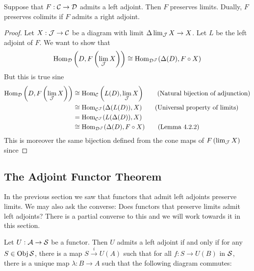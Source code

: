\documentclass[a4paper]{article}
\begin{document}
\begin{prp}{}{} Suppose that $F:\mathcal{C}\to\mathcal{D}$ admits a left adjoint. Then $F$ preserves limits. Dually, $F$ preserves colimits if $F$ admits a right adjoint. \tcbline
\begin{proof}
Let $X:\mathcal{J}\to\mathcal{C}$ be a diagram with limit $\Delta\lim_{\mathcal{J}} X\to X$. Let $L$ be the left adjoint of $F$. We want to show that $$\operatorname{Hom}_{\mathcal{D}}\left(D,F\left(\lim_{\mathcal{J}} X\right)\right)\cong\operatorname{Hom}_{\mathcal{D}^{\mathcal{J}}}(\Delta(D),F\circ X)$$
But this is true sine
\begin{align*}
\operatorname{Hom}_{\mathcal{D}}\left(D,F\left(\lim_{\mathcal{J}} X\right)\right)&\cong\operatorname{Hom}_{\mathcal{C}}\left(L(D),\lim_{\mathcal{J}} X\right)\tag{Natural bijection of adjunction}\\
&\cong\operatorname{Hom}_{\mathcal{C}^{\mathcal{J}}}(\Delta(L(D)),X)\tag{Universal property of limits}\\
&=\operatorname{Hom}_{\mathcal{C}^{\mathcal{J}}}(L(\Delta(D)),X)\\
&\cong\operatorname{Hom}_{\mathcal{D}^{\mathcal{J}}}(\Delta(D),F\circ X)\tag{Lemma 4.2.2}
\end{align*}
This is moreover the same bijection defined from the cone maps of $F\left(\lim_{\mathcal{J}} X\right)$ since
\end{proof}
\end{prp}

\subsection{The Adjoint Functor Theorem}
In the previous section we saw that functors that admit left adjoints preserve limits. We may also ask the converse: Does functors that preserve limits admit left adjoints? There is a partial converse to this and we will work towards it in this section. 

\begin{lmm}{}{} Let $U:\mathcal{A}\to\mathcal{S}$ be a functor. Then $U$ admits a left adjoint if and only if for any $S\in\operatorname{Obj}\mathcal{S}$, there is a map $S\overset{i}{\to}U(A)$ such that for all $f:S\to U(B)$ in $\mathcal{S}$, there is a unique map $\lambda:B\to A$ such that the following diagram commutes: \\~\\
\end{lmm}
\end{document}
